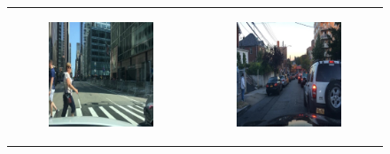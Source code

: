 %
\begin{figure}
    \centering
    \begin{tabular}{p{\horspace} p{\horspace}}
    \begin{subfigure}[b]{\subfigwidth}
        \includegraphics[width=\subfigwidth]{images/gpt4/d2.jpg}
    \end{subfigure}
    \hfill &
    \begin{subfigure}[b]{\subfigwidth}
        \includegraphics[width=\subfigwidth]{images/gpt4/d5.jpg}

\end{subfigure}
\end{tabular}
\end{figure}
